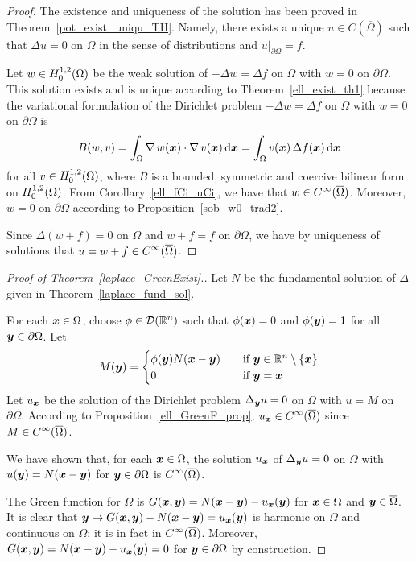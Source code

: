 \begin{proof}
The existence and uniqueness of the solution has been proved in
Theorem~\ref{pot_exist_uniqu_TH}.  Namely, there exists a unique
$u \in C(\overline{\Omega})$ such that $\Delta u = 0$ on $\Omega$ in
the sense of distributions and $u\big|_{\partial \Omega} = f$.

Let $\displaystyle w \in H^{1,2}_0(\Omega)$ be the weak solution of
$-\Delta w = \Delta f$ on $\Omega$ with $w=0$ on $\partial \Omega$.
This solution exists and is unique according to
Theorem~\ref{ell_exist_th1} because the variational formulation of the
Dirichlet problem $-\Delta w = \Delta f$ on $\Omega$ with $w=0$
on $\partial \Omega$ is
\[
B(w,v) = \int_\Omega \operatorname{\nabla} w({\bm{x}}) \cdot \operatorname{\nabla} v({\bm{x}})
\,\mathrm{d}{{\bm{x}}} = \int_\Omega v({\bm{x}}) \, \Delta f({\bm{x}})
\,\mathrm{d}{{\bm{x}}}
\]
for all $\displaystyle v \in H^{1,2}_0(\Omega)$,
where $B$ is a bounded, symmetric and coercive bilinear form on
$\displaystyle H^{1,2}_0(\Omega)$.
From Corollary~\ref{ell_fCi_uCi}, we have that
$\displaystyle w \in C^\infty(\overline{\Omega})$.  Moreover, $w=0$ on
$\partial \Omega$ according to Proposition~\ref{sob_w0_trad2}.

Since $\Delta (w+f) = 0$ on $\Omega$ and $w+f =f$ on
$\partial \Omega$, we have by uniqueness of solutions that
$\displaystyle u = w+f \in C^\infty(\overline{\Omega})$.
\end{proof}

\begin{proof}[Proof of Theorem~\ref{laplace_GreenExist}.]
Let $N$ be the fundamental solution of $\Delta$ given in
Theorem~\ref{laplace_fund_sol}.

 For each ${\bm{x}} \in \Omega$, choose
$\displaystyle \phi \in \mathcal{D}(\mathbb{R}^n)$ such that $\phi({\bm{x}})=0$ and
$\phi({\bm{y}}) = 1$ for all ${\bm{y}} \in \partial \Omega$.  Let
\[
M({\bm{y}}) =
\begin{cases}
\phi({\bm{y}})N({\bm{x}}-{\bm{y}}) & \quad \text{if} \ {\bm{y}} \in
\mathbb{R}^n\setminus \{{\bm{x}}\} \\
0 & \quad \text{if} \ {\bm{y}} = {\bm{x}}
\end{cases}
\]
Let $u_{{\bm{x}}}$ be the solution of the Dirichlet problem
$\Delta_{{\bm{y}}} u = 0$ on $\Omega$ with $u = M$ on $\partial \Omega$.
According to Proposition~\ref{ell_GreenF_prop},
$\displaystyle u_{{\bm{x}}} \in C^\infty(\overline{\Omega})$ since
$\displaystyle M \in C^\infty(\overline{\Omega})$.

We have shown that, for each ${\bm{x}} \in \Omega$, the solution
$u_{{\bm{x}}}$ of $\Delta_{{\bm{y}}} u = 0$ on $\Omega$ with
$u({\bm{y}}) = N({\bm{x}}-{\bm{y}})$
for ${\bm{y}} \in \partial \Omega$ is
$\displaystyle C^\infty(\overline{\Omega})$.

 The Green function for $\Omega$ is
$\displaystyle G({\bm{x}},{\bm{y}}) = N({\bm{x}}-{\bm{y}})
- u_{{\bm{x}}}({\bm{y}})$ for ${\bm{x}} \in \Omega$ and
${\bm{y}} \in \overline{\Omega}$.
It is clear that
${\bm{y}} \mapsto G({\bm{x}},{\bm{y}}) - N({\bm{x}}-{\bm{y}}) =
u_{{\bm{x}}}({\bm{y}})$ is harmonic on $\Omega$ and continuous on
$\overline{\Omega}$; it is in fact in
$\displaystyle C^\infty(\overline{\Omega})$.
Moreover,
$G({\bm{x}},{\bm{y}}) = N({\bm{x}}-{\bm{y}}) - u_{{\bm{x}}}({\bm{y}}) = 0$
for ${\bm{y}} \in \partial \Omega$ by construction.
\end{proof}

